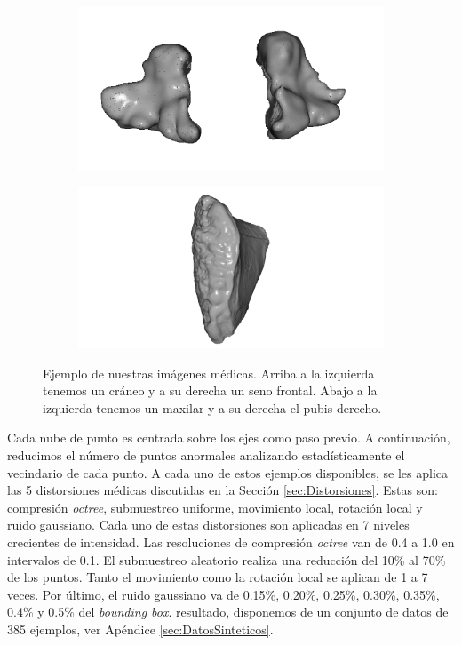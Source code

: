 \begin{figure}[htp]
  \begin{subfigure}[b]{0.40\textwidth}
  \centering 
  \includegraphics[width=\textwidth]{imagenes/chapter4/Maxilar100205.png}
  \end{subfigure}
  \begin{subfigure}[b]{0.40\textwidth}
  \centering 
  \includegraphics[width=\textwidth]{imagenes/chapter4/PubisDch.png}
  \end{subfigure}
  \caption[Ejemplo de nuestras imágenes médicas.]{Ejemplo de nuestras imágenes médicas.
  Arriba a la izquierda tenemos un cráneo y a su derecha un seno frontal. 
  Abajo a la izquierda tenemos un maxilar y a su derecha el pubis derecho.}
  \label{fig:OurDataExample}
\end{figure}

Cada nube de punto es centrada sobre los ejes como paso previo. A continuación, 
reducimos el número de puntos anormales analizando estadísticamente el vecindario de cada punto. 
A cada uno de estos ejemplos disponibles, se les aplica las 5 distorsiones médicas
discutidas en la Sección \ref{sec:Distorsiones}. 
Estas son: compresión \emph{octree}, submuestreo uniforme, movimiento local, rotación local 
y ruido gaussiano. Cada uno de estas distorsiones son 
aplicadas en 7 niveles crecientes de intensidad.
Las resoluciones de compresión \emph{octree} van de 0.4 a 1.0 en intervalos de 0.1.
El submuestreo aleatorio realiza una reducción del 10\% al 70\% de los puntos.
Tanto el movimiento como la rotación local se aplican de 1 a 7 veces.
Por último, el ruido gaussiano va de 0.15\%, 0.20\%, 0.25\%, 0.30\%, 0.35\%, 0.4\% y 0.5\% del \emph{bounding box}.
resultado, disponemos de un conjunto de datos de 385 ejemplos, 
ver Apéndice \ref{sec:DatosSinteticos}. 


